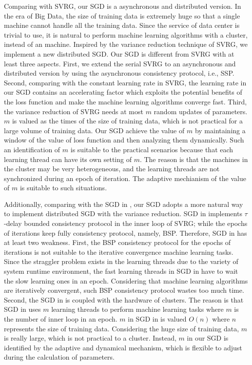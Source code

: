 \documentclass[10pt,journal,finalsubmission,compsoc]{IEEEtran}
\begin{document}
Comparing with SVRG, our SGD is a asynchronous and distributed version. In the era of Big Data, the size of training data is extremely huge so that a single machine cannot handle all the training data. Since the service of data center is trivial to use,  it is natural to perform machine learning algorithms with a cluster, instead of an machine. Inspired by the variance reduction technique of SVRG, we implement a new distributed SGD. Our SGD is different from SVRG with at least three aspects. First, we extend the serial SVRG to an asynchronous and distributed version by using the asynchronous consistency protocol, i.e., SSP. Second, comparing with the constant learning rate in SVRG, the learning rate in our SGD contains an accelerating factor which exploits the potential benefits of the loss function and make the machine learning algorithms converge fast. Third, the variance reduction of SVRG needs at most $m$ random updates of parameters. $m$ is valued as the times of the size of training data, which is not practical for a large volume of training data. Our SGD achieve the value of $m$ by maintaining a window of the value of loss function and then analyzing them dynamically. Such an identification of $m$ is suitable to the practical scenarios because that each learning thread can have its own setting of $m$.  The reason is that the machines in the cluster may be very heterogeneous, and the learning threads are not synchronized during an epoch of iteration. The adaptive mechianism of the value of $m$ is suitable to such situations.

Additionally, comparing with the SGD in \cite{Zhang:2015tp}, our SGD adopts a more natural way to implement distributed SGD with the variance reduction. SGD in \cite{Zhang:2015tp} implements $\tau$-delay bounded consistency protocol in the inner loop of SVRG; while the epochs of iterations keep fully consistency protocol, namely, BSP. Therefore, SGD in \cite{Zhang:2015tp} has at least two weakness. First, the BSP consistency protocol for the epochs of iterations is not suitable to the iterative convergence machine learning tasks. Since the straggler problem exists in the learning threads due to the variety of system runtime environment, the fast learning threads in SGD in \cite{Zhang:2015tp} have to wait the slow learning ones in an epoch. Considering that machine learning algorithms are iteratively convergent, such BSP consistency protocol wastes too much time. Second, the SGD in \cite{Zhang:2015tp} is coupled with the hardware of clusters. The reason is that SGD in \cite{Zhang:2015tp} uses $m$ learning threads to perform machine learning tasks where $m$ is the number of inner loop in an epoch. $m$ in SGD in \cite{Zhang:2015tp} is valued $O(n)$ where $n$ represents the size of training data. Considering the huge size of training data, $m$ is really large, which is not practical to a  cluster. Instead, $m$ in our SGD is identified by the adaptive and dynamical mechanism, which is flexible to adjust during the calculation of parameters.
\end{document}

